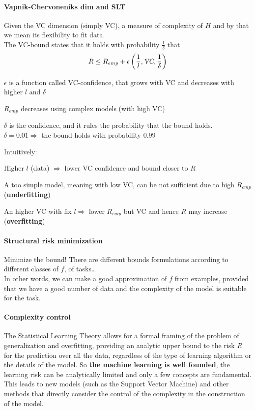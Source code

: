 \documentclass[10pt]{report}
\begin{document}
\paragraph{Vapnik-Chervoneniks dim and SLT} Given the VC dimension (simply VC), a measure of complexity of $H$ and by that we mean its flexibility to fit data.\\
The VC-bound states that it holds with probability $\frac{1}{\delta}$ that $$R \leq R_{emp} + \epsilon\left(\frac{1}{l}, \textsl{VC},\frac{1}{\delta}\right)$$
\begin{list}{}{}
	\item $\epsilon$ is a function called VC-confidence, that grows with VC and decreases with higher $l$ and $\delta$
	\item $R_{emp}$ decreases using complex models (with high VC)
	\item $\delta$ is the confidence, and it rules the probability that the bound holds.\\
	$\delta = 0.01 \Rightarrow$ the bound holds with probability $0.99$
\end{list}
Intuitively:
\begin{list}{}{}
	\item Higher $l$ (data) $\Rightarrow$ lower VC confidence and bound closer to $R$
	\item A too simple model, meaning with low VC, can be not sufficient due to high $R_{emp}$ (\textbf{underfitting})
	\item An higher VC with fix $l \Rightarrow$ lower $R_{emp}$ but VC and hence $R$ may increase (\textbf{overfitting})
\end{list}
\paragraph{Structural risk minimization} Minimize the bound! There are different bounds formulations according to different classes of $f$, of tasks\ldots\\
In other words, we can make a good approximation of $f$ from examples, provided that we have a good number of data and the complexity of the model is suitable for the task.
\paragraph{Complexity control} The Statistical Learning Theory allows for a formal framing of the problem of generalization and overfitting, providing an analytic upper bound to the risk $R$ for the prediction over all the data, regardless of the type of learning algorithm or the details of the model. So \textbf{the machine learning is well founded}, the learning risk can be analytically limited and only a few concepts are fundamental. This leads to new models (such as the Support Vector Machine) and other methods that directly consider the control of the complexity in the construction of the model.
\end{document}
